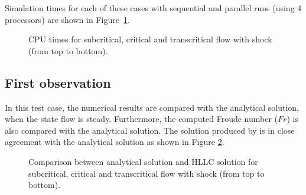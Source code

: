 Simulation times for each of these cases with sequential and parallel runs (using 4 processors) are shown in Figure~\ref{fig:bump:cputime}.

\begin{figure}[H]
  \centering
  \caption{CPU times for subcritical, critical and transcritical flow with shock (from top to bottom).}\label{fig:bump:cputime}
\end{figure}


\subsection{First observation}

In this test case, the numerical results are compared with the
analytical solution, when the state flow is steady. Furthermore, the computed
Froude number ($Fr$) is also
compared with the analytical solution.
The solution produced by  is in close agreement with
the analytical solution as shown in
Figure \ref{fig:bumpsub:fig:hfr}.


\begin{figure}[H]
\begin{minipage}[t]{0.5\textwidth}
 \centering
\end{minipage}%
\begin{minipage}[t]{0.5\textwidth}
 \centering
\end{minipage}
\begin{minipage}[t]{0.5\textwidth}
 \centering
\end{minipage}%
\begin{minipage}[t]{0.5\textwidth}
 \centering
\end{minipage}
\begin{minipage}[t]{0.5\textwidth}
 \centering
\end{minipage}%
\begin{minipage}[t]{0.5\textwidth}
 \centering
\end{minipage}
 \caption{Comparison between analytical solution and  HLLC
 solution for subcritical, critical and transcritical flow with shock (from top to bottom).}\label{fig:bumpsub:fig:hfr}
\end{figure}


